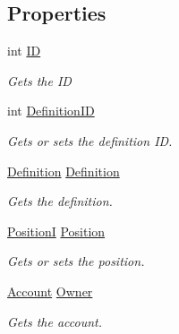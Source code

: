 \subsection*{Properties}
\begin{DoxyCompactItemize}
\item 
int \hyperlink{classCore_1_1Models_1_1Entity_aa7b2cae79fc1801861c7cd20e273e3fd}{I\+D}
\begin{DoxyCompactList}\small\item\em Gets the I\+D \end{DoxyCompactList}\item 
int \hyperlink{classCore_1_1Models_1_1Entity_a451f76265fc15cbcdfc1ac5233bf79e9}{Definition\+I\+D}
\begin{DoxyCompactList}\small\item\em Gets or sets the definition I\+D. \end{DoxyCompactList}\item 
\hyperlink{classCore_1_1Models_1_1Definitions_1_1Definition}{Definition} \hyperlink{classCore_1_1Models_1_1Entity_a9d7325d3a3958dc2acfe798a2fb5a98c}{Definition}
\begin{DoxyCompactList}\small\item\em Gets the definition. \end{DoxyCompactList}\item 
\hyperlink{classCore_1_1Models_1_1PositionI}{Position\+I} \hyperlink{classCore_1_1Models_1_1Entity_a0c56e42b49dbe385d0e201a42ab1feea}{Position}
\begin{DoxyCompactList}\small\item\em Gets or sets the position. \end{DoxyCompactList}\item 
\hyperlink{classCore_1_1Models_1_1Account}{Account} \hyperlink{classCore_1_1Models_1_1Entity_af0d2b689cfd48dc43ad41c49073497df}{Owner}
\begin{DoxyCompactList}\small\item\em Gets the account. \end{DoxyCompactList}\item 

\end{DoxyCompactItemize}
